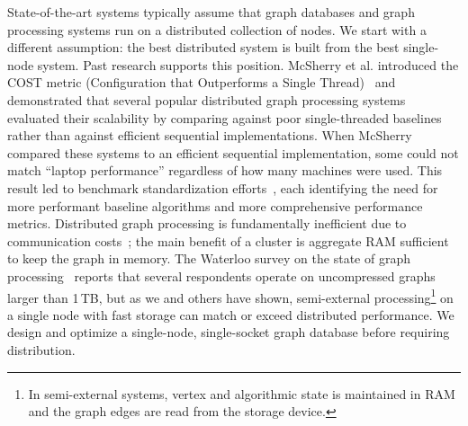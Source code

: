 State-of-the-art systems typically assume that graph databases and graph processing systems run on a distributed collection of nodes.
We start with a different assumption: the best distributed system is built from the best single-node system.
Past research supports this position.
McSherry et al. introduced the COST metric (Configuration that Outperforms a Single Thread)~\cite{mcsherry2015scalability} and demonstrated that several popular distributed graph processing systems evaluated their scalability by comparing against poor single-threaded baselines rather than against efficient sequential implementations.
When McSherry compared these systems to an efficient sequential implementation, some could not match ``laptop performance'' regardless of how many machines were used.
This result led to benchmark standardization efforts~\cite{capotua2015graphalytics,mehrotra2024sok,beamer2015gap,graph500}, each identifying the need for more performant baseline algorithms and more comprehensive performance metrics.
Distributed graph processing is fundamentally inefficient due to communication costs~\cite{beamer2016understanding}; the main benefit of a cluster is aggregate RAM sufficient to keep the graph in memory.
The Waterloo survey on the state of graph processing~\cite{ubiquityLargeGraphsVLDB2017} reports that several respondents operate on uncompressed graphs larger than 1\,TB, but as we and others have shown, semi-external processing\footnote{In semi-external systems, vertex and algorithmic state is maintained in RAM and the graph edges are read from the storage device.} on a single node with fast storage can match or exceed distributed performance.
We design and optimize a single-node, single-socket graph database before requiring distribution.

